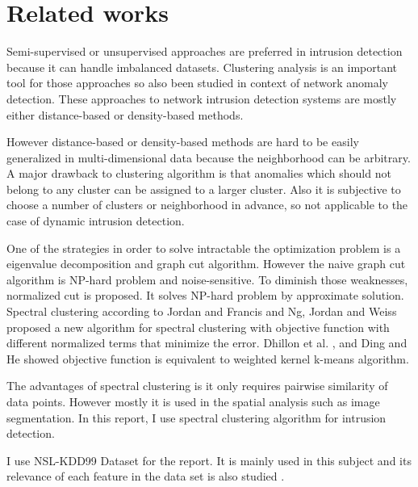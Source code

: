 \section{Related works}
Semi-supervised or unsupervised approaches are preferred in intrusion detection\cite{chandola09} because it can handle imbalanced datasets.
Clustering analysis is an important tool for those approaches so also been studied in context of network anomaly detection. 
These approaches to network intrusion detection systems are mostly either distance-based\cite{knorr00}\cite{ramaswamy00} or density-based methods\cite{breuning00}\cite{aggarwal01}. 

However distance-based or density-based methods are hard to be easily generalized in multi-dimensional data because the neighborhood can be arbitrary. 
A major drawback to clustering algorithm is that anomalies which should not belong to any cluster can be assigned to a larger cluster. 
Also it is subjective to choose a number of clusters or neighborhood in advance, so not applicable to the case of dynamic intrusion detection. 

One of the strategies in order to solve intractable the optimization problem is a eigenvalue decomposition and graph cut algorithm. 
However the naive graph cut algorithm is NP-hard problem and noise-sensitive. 
To diminish those weaknesses, normalized cut\cite{jianbo00} is proposed. 
It solves NP-hard problem by approximate solution.
Spectral clustering according to Jordan and Francis \cite{jordan04} and Ng, Jordan and Weiss \cite{ng01} proposed a new algorithm for spectral clustering with objective function with different normalized terms that minimize the error.
Dhillon et al. \cite{dhillon04}, and Ding and He \cite{cding04} showed objective function is equivalent to weighted kernel k-means algorithm.

The advantages of spectral clustering is it only requires pairwise similarity of data points. 
However mostly it is used in the spatial analysis such as image segmentation. 
In this report, I use spectral clustering algorithm for intrusion detection. 

I use NSL-KDD99 Dataset for the report. 
It is mainly used in this subject\cite{tavallaee09} and its relevance of each feature in the data set is also studied\cite{olusola10} \cite{kayacik05}. 

